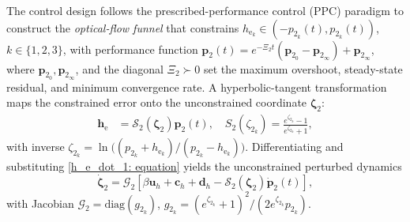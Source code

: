 \documentclass{IEEEtaes}
\begin{document}
The control design follows the prescribed-performance control (PPC) paradigm \cite{lin2022} to construct the \emph{optical-flow funnel} that constrains $h_{\text{e}_k}\in(-p_{2_k}(t),p_{2_k}(t))$, $k\in\{1,2,3\}$, with performance function $\boldsymbol{p}_2(t) = e^{-\Xi_2 t}(\boldsymbol{p}_{2_0}-\boldsymbol{p}_{2_\infty})+\boldsymbol{p}_{2_\infty}$, where $\boldsymbol{p}_{2_0},\boldsymbol{p}_{2_\infty}$, and the diagonal $\Xi_2\succ 0$ set the maximum overshoot, steady-state residual, and minimum convergence rate. A hyperbolic-tangent transformation maps the constrained error onto the unconstrained coordinate $\boldsymbol{\zeta}_2$:
\begin{align}
    \label{optical flow error transformation: equation}
    \boldsymbol{h}_\text{e} &= \mathcal{S}_2(\boldsymbol{\zeta}_2)\boldsymbol{p}_2(t),\quad S_2(\zeta_{2_k}) = \frac{e^{\zeta_{2_k}}-1}{e^{\zeta_{2_k}}+1},
\end{align}
with inverse $\zeta_{2_k}=\ln\!\big((p_{2_k}+h_{\text{e}_k})/(p_{2_k}-h_{\text{e}_k})\big)$. Differentiating and substituting \eqref{h_e_dot_1: equation} yields the unconstrained perturbed dynamics
\begin{equation} \label{unconstrained system: equation}
    \dot{\boldsymbol{\zeta}}_2 = \mathcal{G}_2\!\left[\beta\boldsymbol{u}_h + \boldsymbol{c}_h + \boldsymbol{d}_h - \mathcal{S}_2(\boldsymbol{\zeta}_2)\dot{\boldsymbol{p}}_2(t)\right],
\end{equation}
with Jacobian $\mathcal{G}_2=\text{diag}(g_{2_k})$, $g_{2_k}=(e^{\zeta_{2_k}}+1)^2/(2e^{\zeta_{2_k}}p_{2_k})$.
\end{document}
